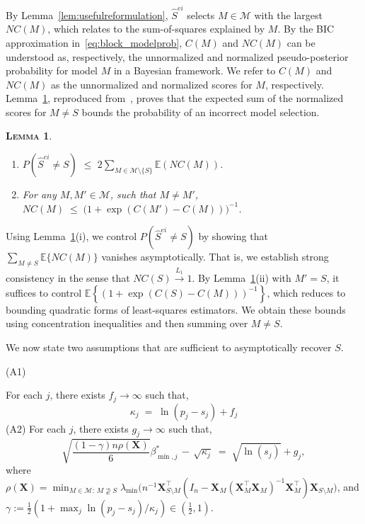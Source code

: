 \documentclass[
  12pt]{article}
\providecommand{\tightlist}{%
  \setlength{\itemsep}{0pt}\setlength{\parskip}{0pt}}\usepackage{longtable,booktabs,array}
\newcommand{\E}{\mathbb{E}}
\newcommand{\M}{\mathcal{M}}
\newcommand{\bX}{\mathbf{X}}
\newtheorem{lem}[thm]{\textsc{Lemma}}
\begin{document}
By Lemma~\ref{lem:usefulreformulation}, $\hat{S}^{ei}$ selects
$M\in \M$ with the largest $NC(M)$, which relates to the sum-of-squares explained by $M$. By the BIC approximation in~\eqref{eq:block_modelprob}, $C(M)$ and $NC(M)$ can be understood as, respectively, the unnormalized and normalized pseudo-posterior probability for model $M$ in a Bayesian framework. 
We refer to $C(M)$ and $NC(M)$ as the unnormalized and normalized scores for $M$, respectively.
Lemma~\ref{lem:L0toL1convergence}, reproduced from~\cite{rossell2022concentration}, proves that the expected sum of the normalized scores for $M\neq S$ bounds the probability of an incorrect model selection. 
\begin{lem}\label{lem:L0toL1convergence}
\begin{enumerate}[label= (\roman*)]\tightlist
\item
$P(\hat{S}^{ei} \neq S) \,\,\leq \,\, 2 \sum_{M \in \M\setminus \{S\}} \E\left(NC(M)\right)$.
\item  For any $M,M'\in\M$, such that $M\neq M'$, 
$NC(M)\;\leq \;\big(1+\exp(C(M')-C(M))\big)^{-1}$.
\end{enumerate}
\end{lem}
Using Lemma~\ref{lem:L0toL1convergence}(i), we control $P(\hat{S}^{ei} \neq S)$ by showing that
$\sum_{M\neq S}\E\{NC(M)\}$ vanishes asymptotically.
That is, we establish strong consistency in the sense that $NC(S) \stackrel{L_1}{\longrightarrow} 1$.
By Lemma~\ref{lem:L0toL1convergence}(ii) with $M'=S$, it suffices to control
$\E\!\left\{(1+\exp(C(S)-C(M)))^{-1}\right\}$, which reduces to bounding quadratic forms
of least-squares estimators.
We obtain these bounds using concentration inequalities and then summing over $M\neq S$.


We now state two assumptions that are sufficient to asymptotically recover $S$.

\hypertarget{lab:A1}{(A1)} \quad For each $j$, there exists $f_j\to \infty$ such that, 
\begin{equation*}
    \kappa_j \;=\;\ln(p_j-s_j) + f_j
\end{equation*} 
\hypertarget{lab:A2}{(A2)} \quad For each $j$, there exists $g_j\to \infty$ such that,
    \begin{equation*}
        \sqrt{\frac{(1-\gamma) n\rho(\bX)}{6}}{\beta_{\min,j}^*} \,- \,\sqrt{\kappa_j} \;=\; \sqrt{\ln(s_j)} + g_j,
    \end{equation*}
where $\rho(\bX)=\min_{M \in \M:\, M\not \supseteq S} \lambda_{\min}\big({n}^{-1} \bX_{S \setminus M}^{\top}\left(I_n- \bX_{M}\left(\bX_{M}^{\top} \bX_{M}\right)^{-1} \bX_{M}^{\top}\right) \bX_{S \setminus M}\big)$, and $\gamma:=\tfrac12(1+\max_j\ln(p_j-s_j)/\kappa_j)\in (\tfrac12, 1)$.
\end{document}
